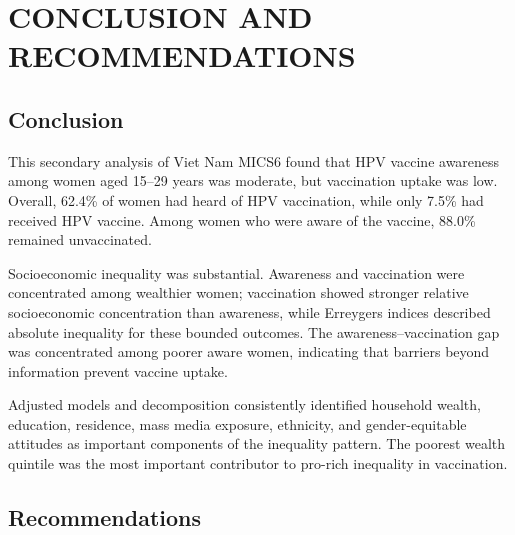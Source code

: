 \chapter*{CONCLUSION AND RECOMMENDATIONS}
{}

\section*{Conclusion}

This secondary analysis of Viet Nam MICS6 found that HPV vaccine awareness among women aged 15--29 years was moderate, but vaccination uptake was low. Overall, 62.4\% of women had heard of HPV vaccination, while only 7.5\% had received HPV vaccine. Among women who were aware of the vaccine, 88.0\% remained unvaccinated.

Socioeconomic inequality was substantial. Awareness and vaccination were concentrated among wealthier women; vaccination showed stronger relative socioeconomic concentration than awareness, while Erreygers indices described absolute inequality for these bounded outcomes. The awareness--vaccination gap was concentrated among poorer aware women, indicating that barriers beyond information prevent vaccine uptake.

Adjusted models and decomposition consistently identified household wealth, education, residence, mass media exposure, ethnicity, and gender-equitable attitudes as important components of the inequality pattern. The poorest wealth quintile was the most important contributor to pro-rich inequality in vaccination.

\section*{Recommendations}

